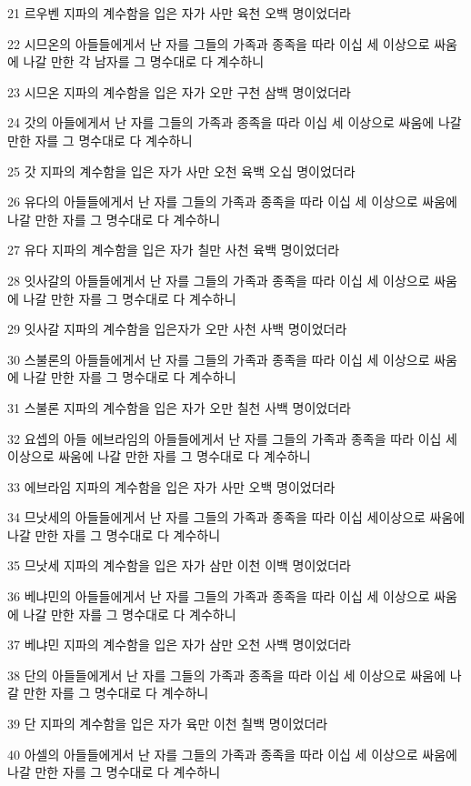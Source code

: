\par 21 르우벤 지파의 계수함을 입은 자가 사만 육천 오백 명이었더라
\par 22 시므온의 아들들에게서 난 자를 그들의 가족과 종족을 따라 이십 세 이상으로 싸움에 나갈 만한 각 남자를 그 명수대로 다 계수하니
\par 23 시므온 지파의 계수함을 입은 자가 오만 구천 삼백 명이었더라
\par 24 갓의 아들에게서 난 자를 그들의 가족과 종족을 따라 이십 세 이상으로 싸움에 나갈 만한 자를 그 명수대로 다 계수하니
\par 25 갓 지파의 계수함을 입은 자가 사만 오천 육백 오십 명이었더라
\par 26 유다의 아들들에게서 난 자를 그들의 가족과 종족을 따라 이십 세 이상으로 싸움에 나갈 만한 자를 그 명수대로 다 계수하니
\par 27 유다 지파의 계수함을 입은 자가 칠만 사천 육백 명이었더라
\par 28 잇사갈의 아들들에게서 난 자를 그들의 가족과 종족을 따라 이십 세 이상으로 싸움에 나갈 만한 자를 그 명수대로 다 계수하니
\par 29 잇사갈 지파의 계수함을 입은자가 오만 사천 사백 명이었더라
\par 30 스불론의 아들들에게서 난 자를 그들의 가족과 종족을 따라 이십 세 이상으로 싸움에 나갈 만한 자를 그 명수대로 다 계수하니
\par 31 스불론 지파의 계수함을 입은 자가 오만 칠천 사백 명이었더라
\par 32 요셉의 아들 에브라임의 아들들에게서 난 자를 그들의 가족과 종족을 따라 이십 세 이상으로 싸움에 나갈 만한 자를 그 명수대로 다 계수하니
\par 33 에브라임 지파의 계수함을 입은 자가 사만 오백 명이었더라
\par 34 므낫세의 아들들에게서 난 자를 그들의 가족과 종족을 따라 이십 세이상으로 싸움에 나갈 만한 자를 그 명수대로 다 계수하니
\par 35 므낫세 지파의 계수함을 입은 자가 삼만 이천 이백 명이었더라
\par 36 베냐민의 아들들에게서 난 자를 그들의 가족과 종족을 따라 이십 세 이상으로 싸움에 나갈 만한 자를 그 명수대로 다 계수하니
\par 37 베냐민 지파의 계수함을 입은 자가 삼만 오천 사백 명이었더라
\par 38 단의 아들들에게서 난 자를 그들의 가족과 종족을 따라 이십 세 이상으로 싸움에 나갈 만한 자를 그 명수대로 다 계수하니
\par 39 단 지파의 계수함을 입은 자가 육만 이천 칠백 명이었더라
\par 40 아셀의 아들들에게서 난 자를 그들의 가족과 종족을 따라 이십 세 이상으로 싸움에 나갈 만한 자를 그 명수대로 다 계수하니
